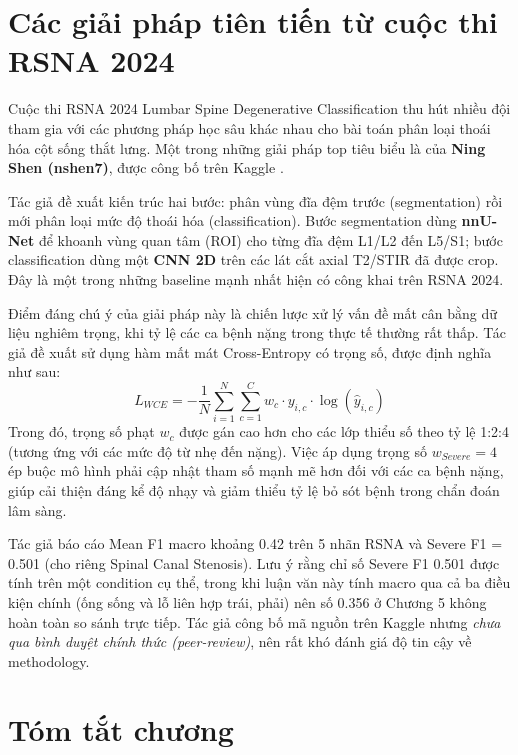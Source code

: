 \section{Các giải pháp tiên tiến từ cuộc thi RSNA 2024}
\label{sec:rw_rsna}

Cuộc thi RSNA 2024 Lumbar Spine Degenerative Classification thu hút nhiều đội tham gia với các phương pháp học sâu khác nhau cho bài toán phân loại thoái hóa cột sống thắt lưng. Một trong những giải pháp top tiêu biểu là của \textbf{Ning Shen (nshen7)}, được công bố trên Kaggle \cite{nshen7_rsna2024}.

Tác giả đề xuất kiến trúc hai bước: phân vùng đĩa đệm trước (segmentation) rồi mới phân loại mức độ thoái hóa (classification). Bước segmentation dùng \textbf{nnU-Net} để khoanh vùng quan tâm (ROI) cho từng đĩa đệm L1/L2 đến L5/S1; bước classification dùng một \textbf{CNN 2D} trên các lát cắt axial T2/STIR đã được crop. Đây là một trong những baseline mạnh nhất hiện có công khai trên RSNA 2024.

Điểm đáng chú ý của giải pháp này là chiến lược xử lý vấn đề mất cân bằng dữ liệu nghiêm trọng, khi tỷ lệ các ca bệnh nặng trong thực tế thường rất thấp. Tác giả đề xuất sử dụng hàm mất mát Cross-Entropy có trọng số, được định nghĩa như sau:
\begin{equation}
    L_{WCE} = - \frac{1}{N} \sum_{i=1}^{N} \sum_{c=1}^{C} w_c \cdot y_{i,c} \cdot \log(\hat{y}_{i,c})
\end{equation}
Trong đó, trọng số phạt $w_c$ được gán cao hơn cho các lớp thiểu số theo tỷ lệ 1:2:4 (tương ứng với các mức độ từ nhẹ đến nặng). Việc áp dụng trọng số $w_{Severe} = 4$ ép buộc mô hình phải cập nhật tham số mạnh mẽ hơn đối với các ca bệnh nặng, giúp cải thiện đáng kể độ nhạy và giảm thiểu tỷ lệ bỏ sót bệnh trong chẩn đoán lâm sàng.

Tác giả báo cáo Mean F1 macro khoảng 0.42 trên 5 nhãn RSNA và Severe F1 = 0.501 (cho riêng Spinal Canal Stenosis). Lưu ý rằng chỉ số Severe F1 0.501 được tính trên một condition cụ thể, trong khi luận văn này tính macro qua cả ba điều kiện chính (ống sống và lỗ liên hợp trái, phải) nên số 0.356 ở Chương 5 không hoàn toàn so sánh trực tiếp. Tác giả công bố mã nguồn trên Kaggle nhưng \emph{chưa qua bình duyệt chính thức (peer-review)}, nên rất khó đánh giá độ tin cậy về methodology.

\section{Tóm tắt chương}

